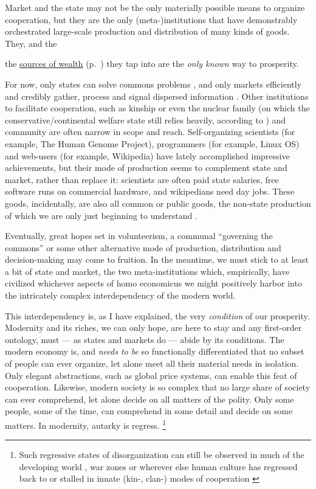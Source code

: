 Market and the state may not be the only materially possible means to organize cooperation, but they are the only (meta-)institutions that have demonstrably orchestrated large-scale production and distribution of many kinds of goods.
They, and the {the \hyperref[sec:sources-of-wealth]{sources of wealth} (p.~\pageref{sec:sources-of-wealth}) they tap into are the \emph{only known} way to prosperity.

For now, only states can solve commons problems \citep[for example,]{Hardin-1968-aa}, and only markets efficiently and credibly gather, process and signal dispersed information \citep{Hayek1931}.
Other institutions to facilitate cooperation, such as kinship \citep{Van-den-Berghe-1981-aa,Hammond2006} or even the nuclear family (on which the conservative/continental welfare state still relies heavily, according to \citealt{Esping-Andersen-1990-aa}) and community \citep{Ostrom1990} are often narrow in scope and reach.
Self-organizing scientists (for example, The Human Genome Project), programmers (for example, Linux OS) and web-users (for example, Wikipedia) have lately accomplished impressive achievements, but their mode of production seems to complement state and market, rather than replace it:
scientists are often paid state salaries, free software runs on commercial hardware, and wikipedians need day jobs.
These goods, incidentally, are also all common or public goods, the non-state production of which we are only just beginning to understand \citep{Ostrom1990}.

Eventually, great hopes set in volunteerism, a communal ``governing the commons'' \citep{Ostrom1990} or some other alternative mode of production, distribution and decision-making may come to fruition.
In the meantime, we must stick to at least a bit of state and market, the two meta-institutions which, empirically, have civilized whichever aspects of homo economicus we might positively harbor into the intricately complex interdependency of the modern world.

This interdependency is, as I have explained, the very \emph{condition} of our prosperity.
Modernity and its riches, we can only hope, are here to stay \citep{Diamond-2005-aa} and any first-order ontology, must --- as states and markets do --- abide by its conditions.
The modern economy is, and \emph{needs to be} so functionally differentiated that no subset of people can ever organize, let alone meet all their material needs in isolation.
Only elegant abstractions, such as global price systems, can enable this feat of cooperation.
Likewise, modern society is so complex that no large share of society can ever comprehend, let alone decide on all matters of the polity.
Only some people, some of the time, can comprehend in some detail and decide on some matters.
In modernity, autarky is regress.
\footnote{
	Such regressive states of disorganization can still be observed in much of the developing world \citep[confer][]{Clark2007,Easterly-2006-aa}, war zones \citep[on the Iraq example,][]{Baker-IIIHamilton-2006-aa} or wherever else human culture has regressed back to or stalled in innate (kin-, clan-) modes of cooperation \citep[on the southern italian example,][]{PutnamLeonardi-1993-aa}
}

}
